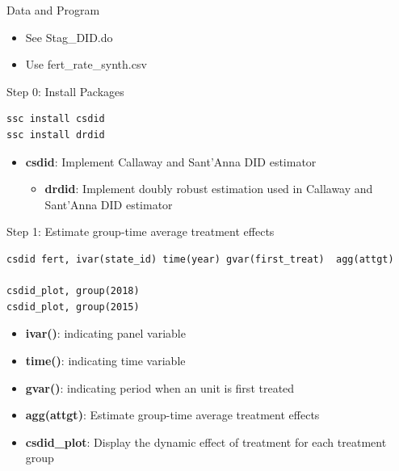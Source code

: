 \documentclass[dvipsnames,hyperref={pdfpagelabels=false}]{beamer}
\begin{document}
\begin{frame}{Data and Program}{}
	\begin{itemize}
		\item See Stag\_DID.do
		\vspace{0.2cm}
		\item Use fert\_rate\_synth.csv
		
		
	\end{itemize}
\end{frame}

\begin{frame}[fragile]{Step 0: Install Packages}
\begin{lstlisting}
ssc install csdid
ssc install drdid
\end{lstlisting}	
	
	
	\begin{itemize}
		\vspace{0.2cm}
		\item \textbf{csdid}: Implement Callaway and Sant'Anna DID estimator
		\vspace{0.2cm}
		\begin{itemize}
			\item \textbf{drdid}: Implement doubly robust estimation used in Callaway and Sant'Anna DID estimator
		\end{itemize}
	\end{itemize}
	
	
	
	
\end{frame}



\begin{frame}[fragile]{Step 1: Estimate group-time average treatment effects}
\begin{lstlisting}
csdid fert, ivar(state_id) time(year) gvar(first_treat)  agg(attgt)

csdid_plot, group(2018)
csdid_plot, group(2015)
\end{lstlisting}	
	
	
	\begin{itemize}
		\vspace{0.2cm}
		\item \textbf{ivar()}: indicating panel variable
		\vspace{0.2cm}
			\item \textbf{time()}: indicating time variable 
			\vspace{0.2cm}
		\item \textbf{gvar()}: indicating period when an unit is first treated
					\vspace{0.2cm}
		\item \textbf{agg(attgt)}: Estimate group-time average treatment effects			
										\vspace{0.2cm}
		\item \textbf{csdid\_plot}: Display the dynamic effect of treatment for each treatment group
	\end{itemize}
	
	
	
	
\end{frame}
\end{document}
